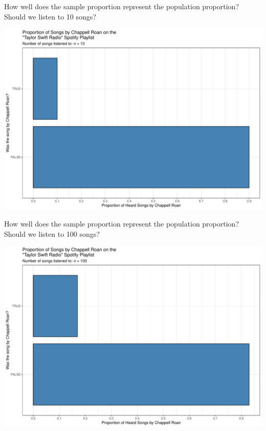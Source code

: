 \documentclass[
  ignorenonframetext,
]{beamer}
\begin{document}
\begin{frame}{How well does the sample proportion represent the
population proportion?}
\label{how-well-does-the-sample-proportion-represent-the-population-proportion-1}
Should we listen to 10 songs?

\includegraphics{class09_files/figure-beamer/unnamed-chunk-8-1.pdf}
\end{frame}

\begin{frame}{How well does the sample proportion represent the
population proportion?}
\label{how-well-does-the-sample-proportion-represent-the-population-proportion-2}
Should we listen to 100 songs?

\includegraphics{class09_files/figure-beamer/unnamed-chunk-9-1.pdf}
\end{frame}
\end{document}
